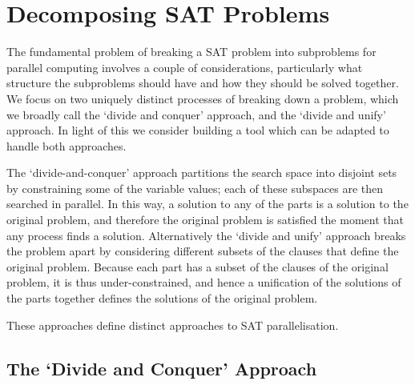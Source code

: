 \documentclass[
10pt, %
a4paper, %
oneside, %
headinclude,footinclude, %
BCOR5mm, %
]{scrartcl}
\begin{document}
\section{Decomposing SAT Problems}\label{sec:decompositions}

The fundamental problem of breaking a SAT problem into subproblems for parallel computing involves a couple of considerations, particularly what structure the subproblems should have and how they should be solved together.
We focus on two uniquely distinct processes of breaking down a problem, which we broadly call the `divide and conquer' approach, and the `divide and unify' approach.
In light of this we consider building a tool which can be adapted to handle both approaches.

The `divide-and-conquer' approach partitions the search space into disjoint sets by constraining some of the variable values; each of these subspaces are then searched in parallel.
In this way, a solution to any of the parts is a solution to the original problem, and therefore the original problem is satisfied the moment that any process finds a solution.
Alternatively the `divide and unify' approach breaks the problem apart by considering different subsets of the clauses that define the original problem. Because each part has a subset of the clauses of the original problem, it is thus under-constrained, and hence a unification of the solutions of the parts together defines the solutions of the original problem.

These approaches define distinct approaches to SAT parallelisation.

\subsection{The `Divide and Conquer' Approach}
\end{document}
